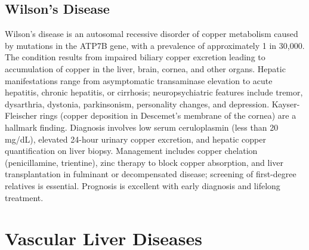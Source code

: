 \subsection{Wilson's Disease}
\label{sec:Wilson's Disease}
Wilson's disease is an autosomal recessive disorder of copper metabolism caused by mutations in the ATP7B gene, with a prevalence of approximately 1 in 30,000. The condition results from impaired biliary copper excretion leading to accumulation of copper in the liver, brain, cornea, and other organs. Hepatic manifestations range from asymptomatic transaminase elevation to acute hepatitis, chronic hepatitis, or cirrhosis; neuropsychiatric features include tremor, dysarthria, dystonia, parkinsonism, personality changes, and depression. Kayser-Fleischer rings (copper deposition in Descemet's membrane of the cornea) are a hallmark finding. Diagnosis involves low serum ceruloplasmin (less than 20 mg/dL), elevated 24-hour urinary copper excretion, and hepatic copper quantification on liver biopsy. Management includes copper chelation (penicillamine, trientine), zinc therapy to block copper absorption, and liver transplantation in fulminant or decompensated disease; screening of first-degree relatives is essential. Prognosis is excellent with early diagnosis and lifelong treatment.

\section{Vascular Liver Diseases}








\label{sec:Vascular Liver Diseases}

